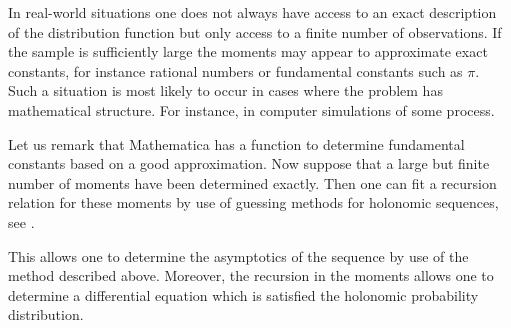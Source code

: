 \begin{remark}
  In real-world situations one does not always have access to an exact description of the distribution function but only access to a finite number of observations. 
  If the sample is sufficiently large the moments may appear to approximate exact constants, for instance rational numbers or fundamental constants such as $\pi$. 
  Such a situation is most likely to occur in cases where the problem has mathematical structure. 
  For instance, in computer simulations of some process. 
  
  Let us remark that Mathematica has a function to determine fundamental constants based on a good approximation. 
  Now suppose that a large but finite number of moments have been determined exactly. 
  Then one can fit a recursion relation for these moments by use of guessing methods for holonomic sequences, see \cite[Section 4]{kauers2013holonomic}.
  
  This allows one to determine the asymptotics of the sequence by use of the method described above. 
  Moreover, the recursion in the moments allows one to determine a differential equation which is satisfied the holonomic probability distribution.
\end{remark}